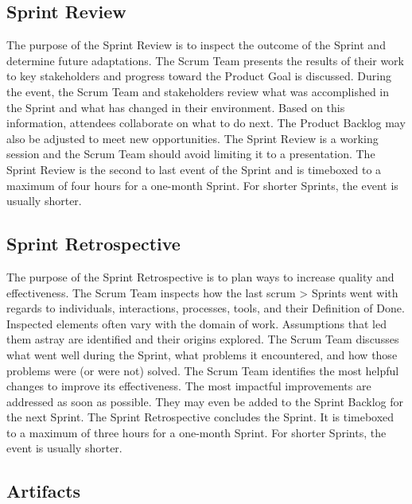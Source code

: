 \subsection{Sprint Review}\label{scrum-sprint-review}

\begin{flushleft}
	The purpose of the Sprint Review is to inspect the outcome of the Sprint and determine
	future adaptations. The Scrum Team presents the results of their work to key stakeholders
	and progress toward the Product Goal is discussed. During the event, the Scrum Team and
	stakeholders review what was accomplished in the Sprint and what has changed in their
	environment. Based on this information, attendees collaborate on what to do next. The
	Product Backlog may also be adjusted to meet new opportunities. The Sprint Review is
	a working session and the Scrum Team should avoid limiting it to a presentation. The
	Sprint Review is the second to last event of the Sprint and is timeboxed to a maximum
	of four hours for a one-month Sprint. For shorter Sprints, the event is usually shorter.
\end{flushleft}

\subsection{Sprint Retrospective}\label{scrum-sprint-retrospective}

\begin{flushleft}
	The purpose of the Sprint Retrospective is to plan ways to increase quality and
	effectiveness. The Scrum Team inspects how the last scrum > Sprints went with
	regards to individuals, interactions, processes, tools, and their Definition
	of Done. Inspected elements often vary with the domain of work. Assumptions
	that led them astray are identified and their origins explored. The Scrum Team
	discusses what went well during the Sprint, what problems it encountered, and
	how those problems were (or were not) solved. The Scrum Team identifies the most
	helpful changes to improve its effectiveness. The most impactful improvements are
	addressed as soon as possible. They may even be added to the Sprint Backlog for
	the next Sprint. The Sprint Retrospective concludes the Sprint. It is timeboxed
	to a maximum of three hours for a one-month Sprint. For shorter Sprints, the event
	is usually shorter.
\end{flushleft}

\subsection{Artifacts}\label{scrum-artifacts}

